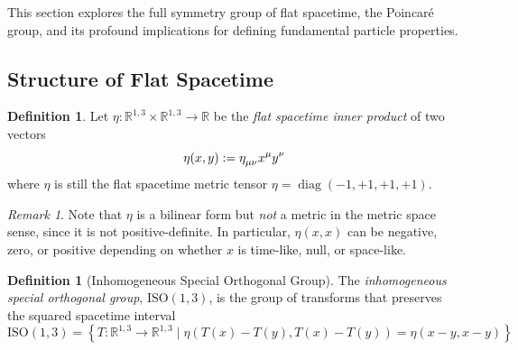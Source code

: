 \documentclass{amsart}
\theoremstyle{definition}
\newtheorem{definition}[theorem]{Definition}
\theoremstyle{remark}
\newtheorem*{remark}{Remark}
\DeclareMathOperator{\diag}{diag}
\begin{document}
This section explores the full symmetry group of flat spacetime, the Poincaré group, and its profound implications for defining fundamental particle properties.

\subsection{Structure of Flat Spacetime}
\label{subsec:sr_structure}

\begin{definition}
  Let $\eta:\mathbb{R}^{1,3}\times\mathbb{R}^{1,3}\to\mathbb{R}$ be the \emph{flat spacetime inner product} of two vectors
  \begin{equation*}
    \eta(x, y) := \tensor{\eta}{_\mu_\nu}\tensor{x}{^\mu}\tensor{y}{^\nu}
  \end{equation*}
  where $\eta$ is still the flat spacetime metric tensor $\eta = \diag(-1, +1, +1, +1)$.
\end{definition}

\begin{remark}
  Note that $\eta$ is a bilinear form but \emph{not} a metric in the metric space sense, since it is not positive-definite. In particular, $\eta(x, x)$ can be negative, zero, or positive depending on whether $x$ is time-like, null, or space-like.
\end{remark}

\begin{definition}[Inhomogeneous Special Orthogonal Group]
  The \emph{inhomogeneous special orthogonal group}, $\mathrm{ISO}(1,3)$, is the group of transforms that preserves the squared spacetime interval
  \begin{equation*}
    \mathrm{ISO}(1, 3) = \left\{T: \mathbb{R}^{1,3} \to \mathbb{R}^{1,3} \mid \eta\left(T(x)-T(y), T(x)-T(y)\right) = \eta(x-y, x-y)\right\}
  \end{equation*}
\end{definition}
\end{document}
